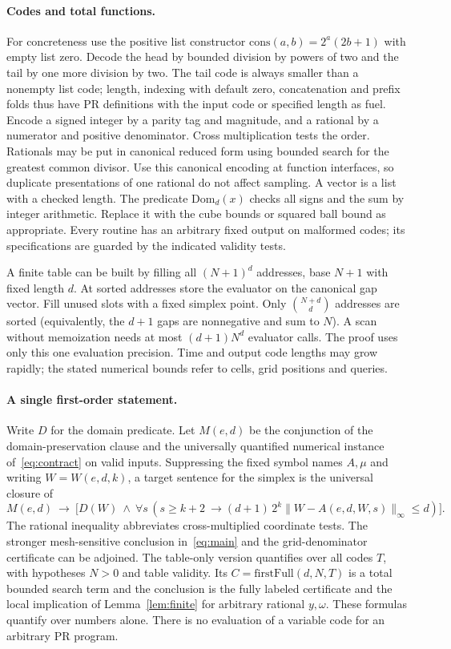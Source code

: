 \documentclass[11pt,letterpaper]{article}
\newcommand{\norm}[1]{\lVert #1\rVert_\infty}
\theoremstyle{claim}\newtheorem{theorem}{Theorem}\newtheorem{lemma}[theorem]{Lemma}
\begin{document}
\paragraph{Codes and total functions.}
For concreteness use the positive list constructor
$\mathrm{cons}(a,b)=2^a(2b+1)$ with empty list zero.
Decode the head by bounded division by powers of two and the tail by one
more division by two. The tail code is always smaller than a nonempty
list code; length, indexing with default zero, concatenation and prefix
folds thus have PR definitions with the input code or specified length
as fuel. Encode a signed integer by a parity tag and magnitude, and a
rational by a numerator and positive denominator. Cross multiplication
tests the order. Rationals may be put in canonical reduced form using
bounded search for the greatest common divisor. Use this canonical encoding
at function interfaces, so duplicate presentations of one rational do not
affect sampling. A vector is a list with a checked length.
The predicate $\mathrm{Dom}_d(x)$ checks all signs and the sum by integer
arithmetic. Replace it with the cube bounds or squared ball bound as
appropriate. Every routine has an arbitrary fixed output on malformed
codes; its specifications are guarded by the indicated validity tests.

A finite table can be built by filling all $(N+1)^d$ addresses, base
$N+1$ with fixed length $d$. At sorted addresses store the evaluator on
the canonical gap vector. Fill unused slots with a fixed simplex point.
Only $\binom{N+d}{d}$ addresses are sorted (equivalently, the $d+1$
gaps are nonnegative and sum to $N$). A scan without memoization needs at most
$(d+1)N^d$ evaluator calls. The proof uses only this one evaluation precision.
Time and output code lengths may grow rapidly; the stated numerical bounds
refer to cells, grid positions and queries.

\paragraph{A single first-order statement.}
Write $D$ for the domain predicate. Let $M(e,d)$ be the conjunction of
the domain-preservation clause and the universally quantified numerical
instance of~\eqref{eq:contract} on valid inputs. Suppressing the fixed
symbol names $A,\mu$ and writing $W=W(e,d,k)$, a target sentence for
the simplex is the universal closure of
\[
 M(e,d)\ \longrightarrow\
 \bigl[D(W)\ \wedge\ \forall s\,(s\ge k+2\ \longrightarrow       (d+1)\,2^k\norm{W-A(e,d,W,s)}\le d)\bigr].
\]
The rational inequality abbreviates cross-multiplied coordinate tests.
The stronger mesh-sensitive conclusion in~\eqref{eq:main} and the
grid-denominator certificate can be adjoined. The table-only version
quantifies over all codes $T$, with hypotheses $N>0$ and table validity.
Its $C=\mathrm{firstFull}(d,N,T)$ is a total bounded search term and the
conclusion is the fully labeled certificate and the local implication of
Lemma~\ref{lem:finite} for arbitrary rational $y,\omega$.
These formulas quantify over numbers alone. There is no evaluation of a
variable code for an arbitrary PR program.
\end{document}
